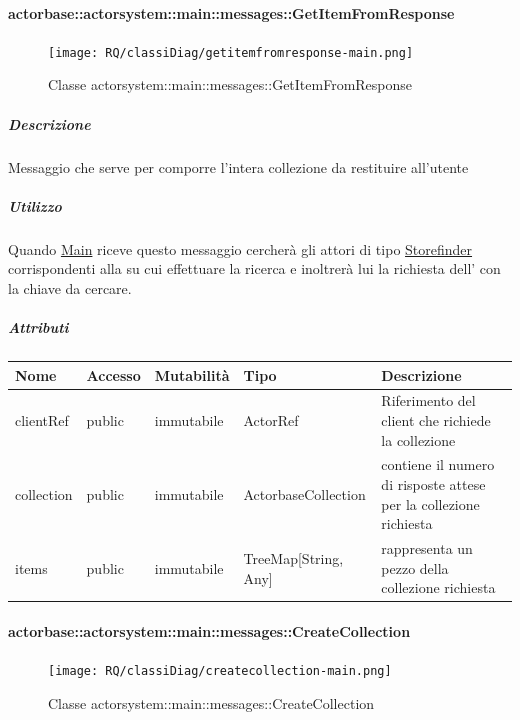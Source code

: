 \documentclass{scalatekids-article}
\begin{document}
\paragraph{actorbase::actorsystem::main::messages::GetItemFromResponse}
\label{sec:actorbase::actorsystem::main::messages::GetItemFromResponse}

\begin{figure}[H]
   \begin{center}
     \texttt{[image: RQ/classiDiag/getitemfromresponse-main.png]}
     \caption{Classe actorsystem::main::messages::GetItemFromResponse}
   \end{center}
 \end{figure}

\subparagraph{Descrizione}

Messaggio che serve per comporre l'intera collezione da restituire all'utente

\subparagraph{Utilizzo}

Quando \hyperref[sec:actorbase::actorsystem::main::Main]{Main}
riceve questo messaggio cercherà gli attori di tipo
\hyperref[sec:actorbase::actorsystem::storefinder::Storefinder]{Storefinder}
corrispondenti alla  su cui effettuare la ricerca
e inoltrerà lui la richiesta dell' con la chiave da cercare.

\subparagraph{Attributi}
\begin{tabular}{| p{3cm} | p{1.5cm} | p{2cm} | p{2cm} | p{8.5cm} |}
  \hline
  Nome & Accesso & Mutabilità & Tipo & Descrizione\\
  \hline
  clientRef & public & immutabile & ActorRef & Riferimento del client che richiede la collezione\\
  \hline
  collection & public & immutabile & ActorbaseCollection & contiene il numero di risposte attese per la collezione richiesta\\
  \hline
  items & public & immutabile & TreeMap[String, Any] & rappresenta un pezzo della collezione richiesta\\
  \hline
\end{tabular}

\paragraph{actorbase::actorsystem::main::messages::CreateCollection}
\label{sec:actorbase::actorsystem::main::messages::CreateCollection}

\begin{figure}[H]
   \begin{center}
     \texttt{[image: RQ/classiDiag/createcollection-main.png]}
     \caption{Classe actorsystem::main::messages::CreateCollection}
   \end{center}
 \end{figure}
\end{document}
